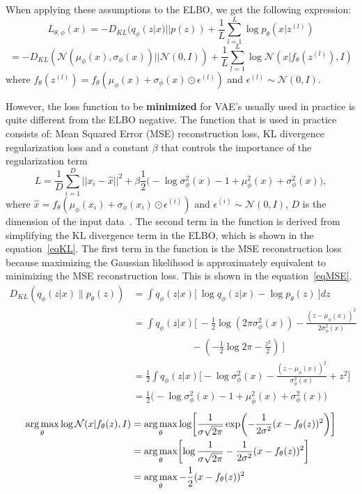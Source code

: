 When applying these assumptions to the ELBO, we get the following expression: \[ L_{\theta, \phi}(x) = - D_{KL}(q_{\phi}(z|x) || p(z)) + \frac{1}{L} \sum_{l=1}^{L} \log p_{\theta}(x|z^{(l)}) \]
\[ = - D_{KL}(\mathcal{N}(\mu_{\phi}(x), \sigma_{\phi}(x)) || \mathcal{N}(0, I)) + \frac{1}{L} \sum_{l=1}^{L} \log \mathcal{N}(x|f_{\theta}(z^{(l)}), I) \]
where $f_{\theta}(z^{(l)}) = f_{\theta}(\mu_{\phi}(x) + \sigma_{\phi}(x) \odot \epsilon^{(l)})$ and $\epsilon^{(l)} \sim \mathcal{N}(0, I)$.

However, the loss function to be \textbf{minimized} for VAE's usually used in practice is quite different from the ELBO negative. 
The function that is used in practice consists of: Mean Squared Error (MSE) reconstruction loss, KL divergence regularization loss and a constant $\beta$ that controls the importance of the regularization term
\[ L = \frac{1}{D} \sum_{i=1}^{D} ||x_i - \hat{x} ||^2 + \beta  \frac{1}{2} \biggl( -\log \sigma^2_\phi(x) - 1 + \mu^2_\phi(x) + \sigma^2_\phi(x) \biggr), \]
where $\hat{x} = f_{\theta}(\mu_{\phi}(x_i) + \sigma_{\phi}(x_i) \odot \epsilon^{(i)})$ and $\epsilon^{(i)} \sim \mathcal{N}(0, I)$, $D$ is the dimension of the input data~\cite{Kingma_2019,betavae}. The second term in the function is derived from simplifying the KL divergence term in the ELBO, which is shown in the equation~\ref{eqKL}. The first term in the function is the MSE reconstruction loss because maximizing the Gaussian likelihood is approximately equivalent to minimizing the MSE reconstruction loss. This is shown in the equation~\ref{eqMSE}.
\begin{equation} \label{eqKL}
    \begin{split}
        D_{KL}(q_\phi(z|x) \| p_\theta(z)) &= \int q_\phi(z|x) \biggl[\ \log q_\phi(z|x) - \log p_\theta(z) \ \biggr] dz \\
        &= \int q_\phi(z|x) \biggl[\ -\frac{1}{2} \log (2\pi\sigma^2_\phi(x)) - \frac{(z - \mu_\phi(x))^2}{2\sigma^2_\phi(x)} \\
        &\qquad\qquad\qquad - \left( -\frac{1}{2} \log 2\pi - \frac{z^2}{2} \right) \ \biggr] \\
        &= \frac{1}{2} \int q_\phi(z|x) \biggl[ -\log \sigma^2_\phi(x) - \frac{(z - \mu_\phi(x))^2}{\sigma^2_\phi(x)} + z^2 \biggr] \\
        &= \frac{1}{2} \biggl( -\log \sigma^2_\phi(x) - 1 + \mu^2_\phi(x) + \sigma^2_\phi(x) \biggr)
    \end{split}
\end{equation}
\begin{equation} \label{eqMSE}
    \begin{split}
        \operatorname*{arg\,max}_{\theta} \log \mathcal{N}(x|f_{\theta}(z), I) & = \operatorname*{arg\,max}_{\theta} \log \biggl[\frac{1}{\sigma \sqrt{2\pi}} \exp \biggl( -\frac{1}{2 \sigma^2} (x - f_{\theta}(z))^2 \biggr)\biggr] \\
        & = \operatorname*{arg\,max}_{\theta} \biggl[ \log \frac{1}{\sigma \sqrt{2\pi}} - \frac{1}{2 \sigma^2} (x - f_{\theta}(z))^2 \biggl]\\
        & = \operatorname*{arg\,max}_{\theta} -\frac{1}{2} (x - f_{\theta}(z))^2
    \end{split}
\end{equation}

